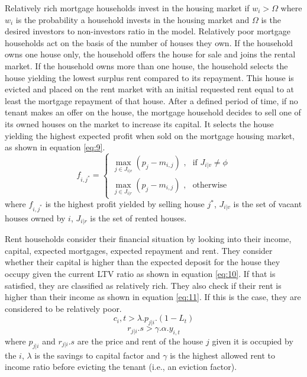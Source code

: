 Relatively rich mortgage households invest in the housing market if \(w_i>\Omega\) where \(w_i\) is the probability a household invests in the housing market and \(\Omega\) is the desired investors to non-investors ratio in the model. Relatively poor mortgage households act on the basis of the number of houses they own. If the household owns one house only, the household offers the house for sale and joins the rental market. If the household owns more than one house, the household selects the house yielding the lowest surplus rent compared to its repayment. This house is evicted and placed on the rent market with an initial requested rent equal to at least the mortgage repayment of that house. After a defined period of time, if no tenant makes an offer on the house, the mortgage household decides to sell one of its owned houses on the market to increase its capital. It selects the house yielding the highest expected profit when sold on the mortgage housing market, as shown in equation \ref{eq:9}.
\begin{equation} \label{eq:9}
    f_{i,j^*} = 
    \begin{cases}
        \max_{j\in{J_{i|v}}}{(p_j - m_{i,j})} \text{ ,} & \text{if } J_{i|v}\neq\phi \\
        \max_{j\in{J_{i|r}}}{(p_j - m_{i,j})} \text{ ,} & \text{otherwise}
    \end{cases}
\end{equation}
where \(f_{i,j^*}\) is the highest profit yielded by selling house \(j^*\), \(J_{i|v}\) is the set of vacant houses owned by \(i\), \(J_{i|r}\) is the set of rented houses.

Rent households consider their financial situation by looking into their income, capital, expected mortgages, expected repayment and rent. They consider whether their capital is higher than the expected deposit for the house they occupy given the current LTV ratio as shown in equation \ref{eq:10}. If that is satisfied, they are classified as relatively rich. They also check if their rent is higher than their income as shown in equation \ref{eq:11}. If this is the case, they are considered to be relatively poor.
\begin{equation} \label{eq:10}
    c_i,t > \lambda.p_{j|i}.(1-L_t)
\end{equation}
\begin{equation} \label{eq:11}
    r_{j|i}.s > \gamma.\alpha.y_{i,t}
\end{equation}
where \(p_{j|i}\) and \(r_{j|i}.s\) are the price and rent of the house \(j\) given it is occupied by the  \(i\), \(\lambda\) is the savings to capital factor and \(\gamma\) is the highest allowed rent to income ratio before evicting the tenant (i.e., an eviction factor).


